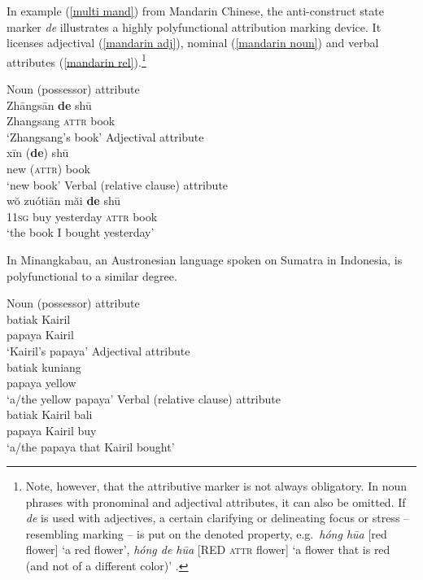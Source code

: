 In example (\ref{multi mand}) from Mandarin Chinese, the anti\hyp{}construct state marker \textit{de} illustrates a highly polyfunctional attribution marking device. It licenses adjectival (\ref{mandarin adj}), nominal (\ref{mandarin noun}) and verbal attributes (\ref{mandarin rel}).\footnote{Note, however, that the attributive marker is not always obligatory. In noun phrases with pronominal and adjectival attributes, it can also be omitted. If \textit{de} is used with adjectives, a certain clarifying or delineating focus or stress – resembling  marking – is put on the denoted property, e.g.~\textit{hóng hūa} [red flower] ‘a red flower’, \textit{hóng de hūa} [RED \textsc{attr} flower] ‘a flower that is red (and not of a different color)’ \citep[119–123]{li-etal1981}.}
\begin{exe}
\ex
{}
\label{multi mand}
\begin{xlist}
\ex	\rm{Noun (possessor) attribute}\\
\gll	Zhāngsān 	\textbf{de} 	shū\\
	Zhangsang 	{\textsc{attr}} 	book\\
\glt	‘Zhangsang's book’\label{mandarin noun}
\ex	\rm{Adjectival attribute}\\
\gll	xīn 		(\textbf{de}) 	shū\\
	new	 	({\textsc{attr}}) 	book\\
\glt	‘new book’\label{mandarin adj}
\ex	\rm{Verbal (relative clause) attribute}\\
\gll	wŏ zuótiān 	măi 	\textbf{de} 	shū\\
	1\textsc{1sg} 	buy	yesterday 	{\textsc{attr}} 	book\\
\glt	‘the book I bought yesterday’\label{mandarin rel}
\end{xlist}
\end{exe}
In Minangkabau, an Austronesian language spoken on Sumatra in Indonesia,  is polyfunctional to a similar degree.
\begin{exe}
\ex 
{} \label{multi minangkabau}
\begin{xlist}
\ex \rm{Noun (possessor) attribute}\\
\gll	batiak Kairil\\
	papaya Kairil\\
\glt	‘Kairil's papaya’
\ex \rm{Adjectival attribute}\\
\gll	batiak kuniang\\
	papaya yellow\\
\glt	‘a/the yellow papaya’
\ex \rm{Verbal (relative clause) attribute}\\
\gll	batiak Kairil bali\\
	papaya Kairil buy\\
\glt	‘a/the papaya that Kairil bought’
\end{xlist}
\end{exe}
